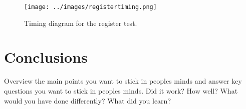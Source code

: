 \documentclass{article}
\begin{document}
\begin{figure}
\begin{center}
\caption{Timing diagram for the register test.}\label{fig:regtest}
\texttt{[image: ../images/registertiming.png]}
\end{center}
\end{figure}

\section{Conclusions}
Overview the main points you want to stick in peoples minds and answer key questions you want to stick in peoples minds.  Did it work?  How well? What would you have done differently?  What did you learn?
\end{document}
